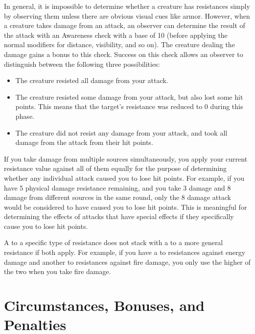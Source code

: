         In general, it is impossible to determine whether a creature has resistances simply by observing them unless there are obvious visual cues like armor.
        However, when a creature takes damage from an attack, an observer can determine the result of the attack with an Awareness check with a base  of 10 (before applying the normal modifiers for distance, visibility, and so on).
        The creature dealing the damage gains a  bonus to this check.
        Success on this check allows an observer to distinguish between the following three possibilities:
        \begin{itemize}
            \item The creature resisted all damage from your attack.
            \item The creature resisted some damage from your attack, but also lost some hit points.
                This means that the target's resistance was reduced to 0 during this phase.
            \item The creature did not resist any damage from your attack, and took all damage from the attack from their hit points.
        \end{itemize}

         If you take damage from multiple sources simultaneously, you apply your current resistance value against all of them equally for the purpose of determining whether any individual attack caused you to lose hit points.
        For example, if you have 5 physical damage resistance remaining, and you take 3 damage and 8 damage from different sources in the same round, only the 8 damage attack would be considered to have caused you to lose hit points.
        This is meaningful for determining the effects of attacks that have special effects if they specifically cause you to lose hit points.

         A  to a specific type of resistance does not stack with a  to a more general resistance if both apply.
        For example, if you have a  to resistances against energy damage and another  to resistances against fire damage, you only use the higher of the two when you take fire damage.

\section{Circumstances, Bonuses, and Penalties}

